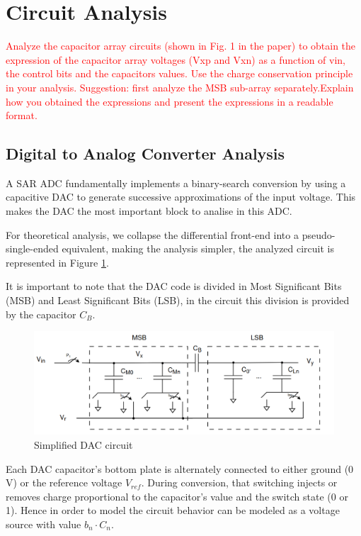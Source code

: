 \section{Circuit Analysis}
\label{sec:circuit_analysis}

\textcolor{red}{Analyze the capacitor array circuits (shown in Fig. 1 in the paper) to obtain the
expression of the capacitor array voltages (Vxp and Vxn) as a function of vin, the control bits and the capacitors values. Use the charge conservation principle in
your analysis. Suggestion: first analyze the MSB sub-array separately.Explain how you obtained the expressions and present the expressions in a readable format.}

\subsection{Digital to Analog Converter Analysis}

A SAR ADC fundamentally implements a binary-search conversion by using a capacitive DAC to generate successive approximations of the input voltage. This makes the DAC the most important block to analise in this ADC. 

For theoretical analysis, we collapse the differential front-end into a pseudo-single-ended equivalent, making the analysis simpler, the analyzed circuit is represented in Figure \ref{fig:DAC_Circ}. 

It is important to note that the DAC code is divided in Most Significant Bits (MSB) and Least Significant Bits (LSB), in the circuit this division is provided by the capacitor $C_B$.

\begin{figure}[H]
    \centering
    \includegraphics*[scale = 0.35]{Images/DacCirc.png}
    \caption{Simplified DAC circuit}
    \label{fig:DAC_Circ}
\end{figure}

Each DAC capacitor's bottom plate is alternately connected to either ground (0 V) or the reference voltage $V_{ref}$. During conversion, that switching injects or removes charge proportional to the capacitor's value and the switch state (0 or 1). Hence in order to model the circuit behavior can be modeled as a voltage source with value $b_n\cdot C_n$. 


